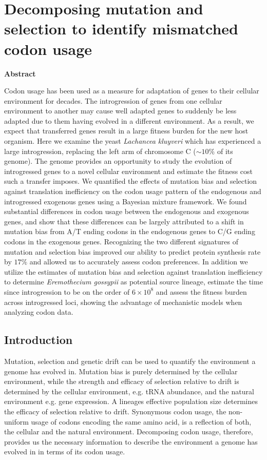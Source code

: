 \chapter{Decomposing mutation and selection to identify mismatched codon usage}
\label{ch:kluyveri}

\newpage
\begin{center}\textbf{Abstract}\end{center}
Codon usage has been used as a measure for adaptation of genes to their cellular environment for decades. 
The introgression of genes from one cellular environment to another may cause well adapted genes to suddenly be less adapted due to them having evolved in a different environment.
As a result, we expect that transferred genes result in a large fitness burden for the new host organism.
Here we examine the yeast \textit{Lachancea kluyveri} which has experienced a large introgression, replacing the left arm of chromosome C ($\sim 10 \%$ of its genome).
The \kluyveri genome provides an opportunity to study the evolution of introgressed genes to a novel cellular environment and estimate the fitness cost such a transfer imposes.
We quantified the effects of mutation bias and selection against translation inefficiency on the codon usage pattern of the endogenous and introgressed exogenous genes using a Bayesian mixture framework.
We found substantial differences in codon usage between the endogenous and exogenous genes, and show that these differences can be largely attributed to a shift in mutation bias from A/T ending codons in the endogenous genes to C/G ending codons in the exogenous genes.
Recognizing the two different signatures of mutation and selection bias improved our ability to predict protein synthesis rate by $17 \%$ and allowed us to accurately assess codon preferences.
In addition we utilize the estimates of mutation bias and selection against translation inefficiency to determine \textit{Eremothecium gossypii} as potential source lineage, estimate the time since introgression to be on the order of $6\times 10^8$ and assess the fitness burden across introgressed loci, showing the advantage of mechanistic models when analyzing codon data.

\newpage


\section{Introduction}

Mutation, selection and genetic drift can be used to quantify the environment a genome has evolved in.
Mutation bias is purely determined by the cellular environment, while the strength and efficacy of selection relative to drift is determined by the cellular environment, e.g. tRNA abundance, and the natural environment e.g. gene expression.
A lineages effective population size determines the efficacy of selection relative to drift.
Synonymous codon usage, the non-uniform usage of codons encoding the same amino acid, is a reflection of both, the cellular and the natural environment.
Decomposing codon usage, therefore, provides us the necessary information to describe the environment a genome has evolved in in terms of its codon usage. 

